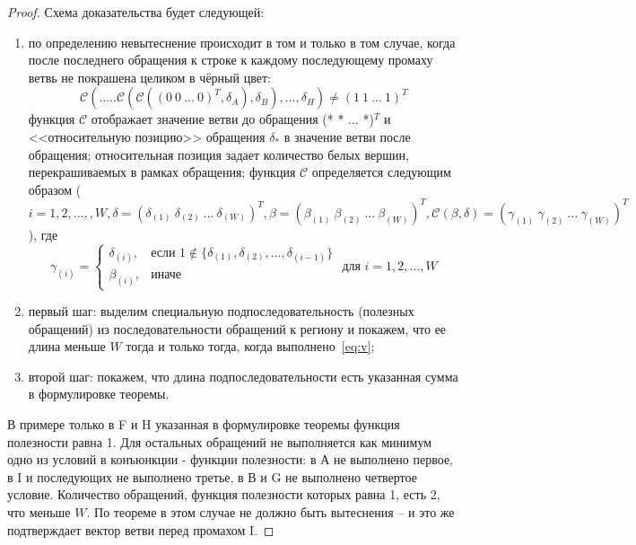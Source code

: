 \begin{proof}
  Схема доказательства будет следующей:
  \begin{enumerate}
    \item по определению \PseudoLRU невытеснение происходит в том и только в том случае, когда после последнего обращения к строке к каждому последующему промаху ветвь не покрашена целиком в чёрный цвет:
        \begin{equation}\label{eq:v}
        \mathcal{C}(.....\mathcal{C}(\mathcal{C}( (0~0~...~0)^T, \delta_A), \delta_B), ..., \delta_H) \neq (1~1~...~1)^T
        \end{equation}
        функция $\mathcal{C}$ отображает значение ветви до обращения (* * ... *)$^T$ и <<относительную позицию>> обращения $\delta_*$ в значение ветви после обращения; относительная позиция задает количество белых вершин, перекрашиваемых в рамках обращения;
        функция $\mathcal{C}$ определяется следующим образом ($i = 1, 2, ..., , W, \delta = (\delta_{(1)}~\delta_{(2)}~...~\delta_{(W)})^T, \beta = (\beta_{(1)}~\beta_{(2)}~...~\beta_{(W)})^T, \mathcal{C}(\beta, \delta) = (\gamma_{(1)}~\gamma_{(2)}~...~\gamma_{(W)})^T$), где
        $$\gamma_{(i)} = \begin{cases}\delta_{(i)} , & \text{если $1 \notin \{\delta_{(1)}, \delta_{(2)}, ..., \delta_{(i-1)}\}$}\\ \beta_{(i)}, &\text{иначе}\end{cases} \mbox{~для~}i = 1, 2,..., W$$

    \item первый шаг: выделим специальную подпоследовательность (полезных обращений) из последовательности обращений к региону и покажем, что ее длина меньше $W$ тогда и только тогда, когда выполнено~\ref{eq:v};

    \item второй шаг: покажем, что длина подпоследовательности есть указанная сумма в формулировке теоремы.
  \end{enumerate}

  В примере только в F и H указанная в формулировке теоремы функция полезности равна 1. Для остальных обращений не выполняется как минимум одно из условий в конъюнкции - функции полезности: в А не выполнено первое, в I и последующих не выполнено третье, в В и G не выполнено четвертое условие. Количество обращений, функция полезности которых равна 1, есть 2, что меньше $W$. По теореме в этом случае не должно быть вытеснения -- и это же подтверждает вектор ветви перед промахом I.


\end{proof}
